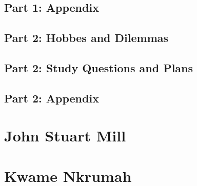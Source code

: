 \documentclass[12pt, letterpaper]{article}
\begin{document}
\subsection{Part 1: Appendix}

\subsection{Part 2: Hobbes and Dilemmas}

\subsection{Part 2: Study Questions and Plans}

\subsection{Part 2: Appendix}

\newpage
\section{John Stuart Mill}


\newpage
\section{Kwame Nkrumah}
\end{document}
